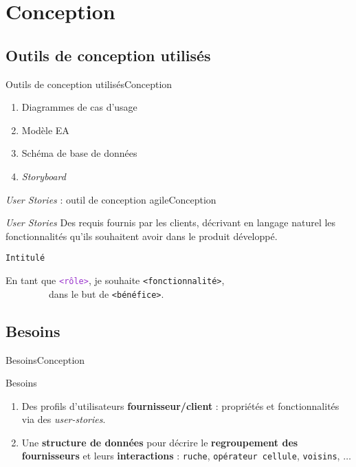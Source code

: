 \documentclass[usenames,dvipsnames]{beamer}
\begin{document}
\section{Conception}
\subsection{Outils de conception utilisés}

\begin{frame}{Outils de conception utilisés}{Conception}
\begin{enumerate}
  \item Diagrammes de cas d'usage
  \item Modèle EA
  \item Schéma de base de données
  \item \textit{Storyboard}
\end{enumerate}
\end{frame}

\begin{frame}{\textit{User Stories} : outil de conception agile}{Conception}
\begin{block}{\textit{User Stories}}
Des requis fournis par les clients, décrivant en langage naturel les fonctionnalités qu'ils souhaitent avoir dans le produit développé.
\end{block}

\begin{block}{\textcolor{Sepia}{\texttt{Intitulé}}}
\begin{it}
  En tant que \textcolor{DarkOrchid}{\texttt{<rôle>}}, je souhaite \textcolor{BrickRed}{\texttt{<fonctionnalité>}}, \\
  ~~~~~~~~~dans le but de \textcolor{OliveGreen}{\texttt{<bénéfice>}}.
\end{it}
\end{block}
\end{frame}

\subsection{Besoins}
\begin{frame}{Besoins}{Conception}
\begin{block}{Besoins}
\begin{enumerate}
  \item Des profils d'utilisateurs \textbf{fournisseur/client} : propriétés et fonctionnalités via des \textit{user-stories}.
  \item Une \textbf{structure de données} pour décrire le \textbf{regroupement des fournisseurs} et leurs \textbf{interactions} : \texttt{ruche}, \texttt{opérateur cellule}, \texttt{voisins}, $\dots$
\end{enumerate}
\end{block}
\end{frame}
\end{document}

